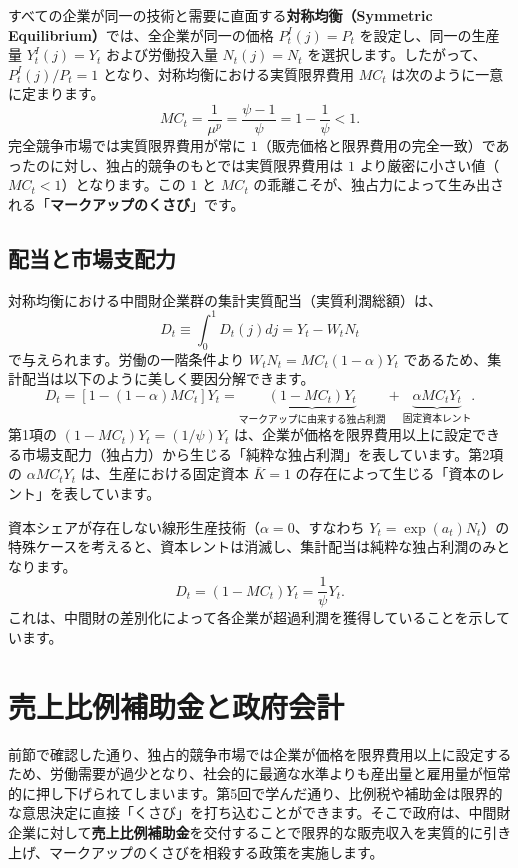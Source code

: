\documentclass[
  japanese,
  lualatex,
  ja=standard,
  12pt,
  a4paper]{ltjsarticle}
\begin{document}
すべての企業が同一の技術と需要に直面する\textbf{対称均衡（Symmetric
Equilibrium）}では、全企業が同一の価格 \(P_t^I(j) = P_t\)
を設定し、同一の生産量 \(Y_t^I(j) = Y_t\) および労働投入量
\(N_t(j) = N_t\) を選択します。したがって、\(P_t^I(j)/P_t = 1\)
となり、対称均衡における実質限界費用 \(MC_t\)
は次のように一意に定まります。 \[
MC_t = \frac{1}{\mu^p} = \frac{\psi-1}{\psi} = 1 - \frac{1}{\psi} < 1.
\] 完全競争市場では実質限界費用が常に
\(1\)（販売価格と限界費用の完全一致）であったのに対し、独占的競争のもとでは実質限界費用は
\(1\) より厳密に小さい値（\(MC_t < 1\)）となります。この \(1\) と
\(MC_t\)
の乖離こそが、独占力によって生み出される「\textbf{マークアップのくさび}」です。

\subsection{配当と市場支配力}\label{ux914dux5f53ux3068ux5e02ux5834ux652fux914dux529b}

対称均衡における中間財企業群の集計実質配当（実質利潤総額）は、 \[
D_t \equiv \int_0^1 D_t(j) dj = Y_t - W_t N_t
\] で与えられます。労働の一階条件より \(W_t N_t = MC_t (1-\alpha) Y_t\)
であるため、集計配当は以下のように美しく要因分解できます。 \[
D_t = \left[ 1 - (1-\alpha) MC_t \right] Y_t = \underbrace{(1 - MC_t) Y_t}_{\text{マークアップに由来する独占利潤}} + \underbrace{\alpha MC_t Y_t}_{\text{固定資本レント}}.
\] 第1項の \((1-MC_t)Y_t = (1/\psi)Y_t\)
は、企業が価格を限界費用以上に設定できる市場支配力（独占力）から生じる「純粋な独占利潤」を表しています。第2項の
\(\alpha MC_t Y_t\) は、生産における固定資本 \(\bar{K}=1\)
の存在によって生じる「資本のレント」を表しています。

資本シェアが存在しない線形生産技術（\(\alpha = 0\)、すなわち
\(Y_t = \exp(a_t)N_t\)）の特殊ケースを考えると、資本レントは消滅し、集計配当は純粋な独占利潤のみとなります。
\[
D_t = (1 - MC_t) Y_t = \frac{1}{\psi} Y_t.
\]
これは、中間財の差別化によって各企業が超過利潤を獲得していることを示しています。

\section{売上比例補助金と政府会計}\label{ux58f2ux4e0aux6bd4ux4f8bux88dcux52a9ux91d1ux3068ux653fux5e9cux4f1aux8a08}

前節で確認した通り、独占的競争市場では企業が価格を限界費用以上に設定するため、労働需要が過少となり、社会的に最適な水準よりも産出量と雇用量が恒常的に押し下げられてしまいます。第5回で学んだ通り、比例税や補助金は限界的な意思決定に直接「くさび」を打ち込むことができます。そこで政府は、中間財企業に対して\textbf{売上比例補助金}を交付することで限界的な販売収入を実質的に引き上げ、マークアップのくさびを相殺する政策を実施します。
\end{document}
